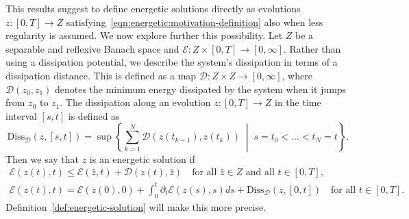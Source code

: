 \documentclass[a4paper,10pt,twoside]{amsbook}
\numberwithin{section}{chapter}
\numberwithin{equation}{chapter}
\theoremstyle{definition}
\begin{document}
This results suggest to define energetic solutions directly as evolutions $z\colon[0,T]\to Z$ satisfying~\eqref{eqn:energetic:motivation-definition} also when less regularity is assumed. We now explore further this possibility. Let $Z$ be a separable and reflexive Banach space and $\mathcal{E}\colon Z\times[0,T]\to[0,\infty]$. Rather than using a dissipation potential, we describe the system's dissipation in terms of a dissipation distance. This is defined as a map $\mathcal D\colon Z\times Z\to[0,\infty]$, where $\mathcal D(z_0,z_1)$ denotes the minimum energy dissipated by the system when it jumps from $z_0$ to $z_1$. The dissipation along an evolution $z\colon[0,T]\to Z$ in the time interval $[s,t]$ is defined as
\[
\text{Diss}_\mathcal{D}(z,[s,t])=\sup\left\{\sum_{k=1}^N\mathcal{D}(z(t_{k-1}),z(t_k))\;\middle|\;s=t_0<\dots<t_N=t\right\}.
\]
Then we say that $z$ is an energetic solution if
\begin{subequations}
\begin{gather}
\mathcal{E}(z(t),t)\le\mathcal{E}(\hat{z},t)+\mathcal{D}(z(t),\hat{z})\quad\text{for all $\hat{z}\in Z$ and all $t\in[0,T]$},\\
\mathcal{E}(z(t),t)=\mathcal{E}(z(0),0)+\int_0^t\partial_t\mathcal{E}(z(s),s)ds+\text{Diss}_\mathcal{D}(z,[0,t])\quad\text{for all $t\in[0,T]$}.
\end{gather}
\end{subequations}
Definition~\ref{def:energetic-solution} will make this more precise.
\end{document}

